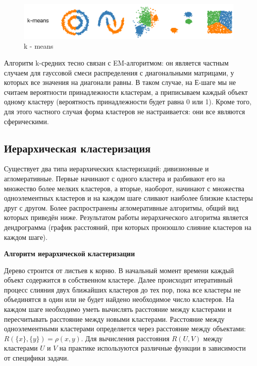 \documentclass[article, 10pt]{disser}
\begin{document}
\begin{figure}[H]
\begin{center}
\includegraphics[scale = 0.25]{k - means.png}
\caption{k - means}
\end{center}
\end{figure}

Алгоритм k-средних тесно связан с EM-алгоритмом: он является частным случаем для гауссовой смеси распределения с диагональными матрицами, у которых все значения на диагонали равны. В таком случае, на Е-шаге мы не считаем вероятности принадлежности кластерам, а приписываем каждый объект одному кластеру (вероятность принадлежности будет равна 0 или 1). Кроме того, для этого частного случая форма кластеров не настраивается: они все являются сферическими.


\subsection{Иерархическая кластеризация}
Существует два типа иерархических кластеризаций: дивизионные и агломеративные. Первые начинают с одного кластера и разбивают его на множество более мелких кластеров, а вторые, наоборот, начинают с множества одноэлементных кластеров и на каждом шаге сливают наиболее близкие кластеры друг с другом. Более распространены агломеративные алгоритмы, общий вид которых приведён ниже. Результатом работы иерархического алгоритма является дендрограмма (график расстояний, при которых произошло слияние кластеров на каждом шаге).
\begin{center}
    \bf{Алгоритм иерархической кластеризации}
\end{center}
Дерево строится от листьев к корню. В начальный момент времени каждый объект содержится в собственном кластере. Далее происходит итеративный процесс слияния двух ближайших кластеров до тех пор, пока все кластеры не объединятся в один или не будет найдено необходимое число кластеров. На каждом шаге необходимо уметь вычислять расстояние между кластерами и пересчитывать расстояние между новыми кластерами. Расстояние между одноэлементными кластерами определяется через расстояние между объектами: $R(\{x\}, \{y\})= \rho(x,y)$. Для вычисления расстояния $R(U, V)$ между кластерами $U$ и $V$ на практике используются различные функции в зависимости от специфики задачи.
\end{document}

